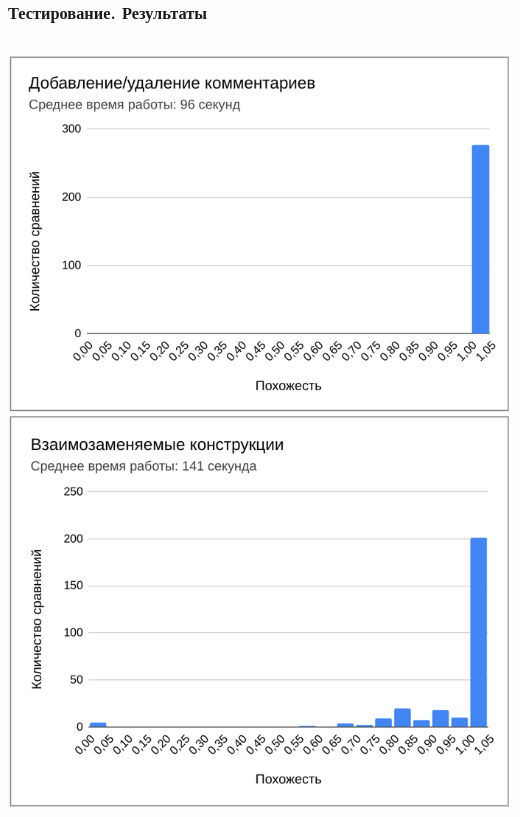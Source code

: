 \documentclass[10pt]{beamer}
\begin{document}
\begin{frame}\frametitle{Тестирование. Результаты}
	\begin{columns}
		\centering
		\includegraphics[scale=0.52]{res.png}
		

\end{columns}
\end{frame}
\end{document}
